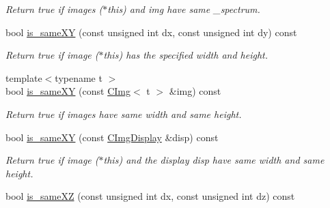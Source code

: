 \begin{DoxyCompactItemize}
\begin{DoxyCompactList}\small\item\em Return {\ttfamily true} if images {\ttfamily }($\ast$this) and {\ttfamily img} have same \_\-spectrum. \item\end{DoxyCompactList}\item 
\hypertarget{structcimg__library_1_1CImg_af202a5fce446abc81966aa0df075075c}{
bool \hyperlink{structcimg__library_1_1CImg_af202a5fce446abc81966aa0df075075c}{is\_\-sameXY} (const unsigned int dx, const unsigned int dy) const }
\label{structcimg__library_1_1CImg_af202a5fce446abc81966aa0df075075c}

\begin{DoxyCompactList}\small\item\em Return {\ttfamily true} if image ($\ast$this) has the specified width and height. \item\end{DoxyCompactList}\item 
\hypertarget{structcimg__library_1_1CImg_a36f980621a1b6cfac495bc3664459728}{
{\footnotesize template$<$typename t $>$ }\\bool \hyperlink{structcimg__library_1_1CImg_a36f980621a1b6cfac495bc3664459728}{is\_\-sameXY} (const \hyperlink{structcimg__library_1_1CImg}{CImg}$<$ t $>$ \&img) const }
\label{structcimg__library_1_1CImg_a36f980621a1b6cfac495bc3664459728}

\begin{DoxyCompactList}\small\item\em Return {\ttfamily true} if images have same width and same height. \item\end{DoxyCompactList}\item 
\hypertarget{structcimg__library_1_1CImg_a75f62ffd782356fa2db23289bf97bed3}{
bool \hyperlink{structcimg__library_1_1CImg_a75f62ffd782356fa2db23289bf97bed3}{is\_\-sameXY} (const \hyperlink{structcimg__library_1_1CImgDisplay}{CImgDisplay} \&disp) const }
\label{structcimg__library_1_1CImg_a75f62ffd782356fa2db23289bf97bed3}

\begin{DoxyCompactList}\small\item\em Return {\ttfamily true} if image {\ttfamily }($\ast$this) and the display {\ttfamily disp} have same width and same height. \item\end{DoxyCompactList}\item 
\hypertarget{structcimg__library_1_1CImg_a3d19709f9f46ca0ab06a5942f91b8ee4}{
bool \hyperlink{structcimg__library_1_1CImg_a3d19709f9f46ca0ab06a5942f91b8ee4}{is\_\-sameXZ} (const unsigned int dx, const unsigned int dz) const }
\label{structcimg__library_1_1CImg_a3d19709f9f46ca0ab06a5942f91b8ee4}


\end{DoxyCompactItemize}
